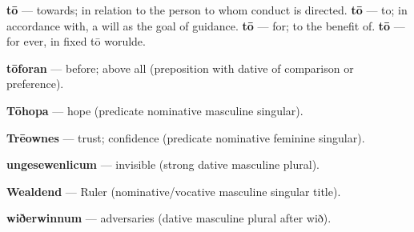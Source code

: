 \textbf{tō} — towards; in relation to the person to whom conduct is directed. \textbf{tō} — to; in accordance with, a will as the goal of guidance. \textbf{tō} — for; to the benefit of. \textbf{tō} — for ever, in fixed tō worulde.

\textbf{tōforan} — before; above all (preposition with dative of comparison or preference).

\textbf{Tōhopa} — hope (predicate nominative masculine singular).

\textbf{Trēownes} — trust; confidence (predicate nominative feminine singular).

\textbf{ungesewenlicum} — invisible (strong dative masculine plural).

\textbf{Wealdend} — Ruler (nominative/\allowbreak{}vocative masculine singular title).

\textbf{wiðerwinnum} — adversaries (dative masculine plural after wið).

